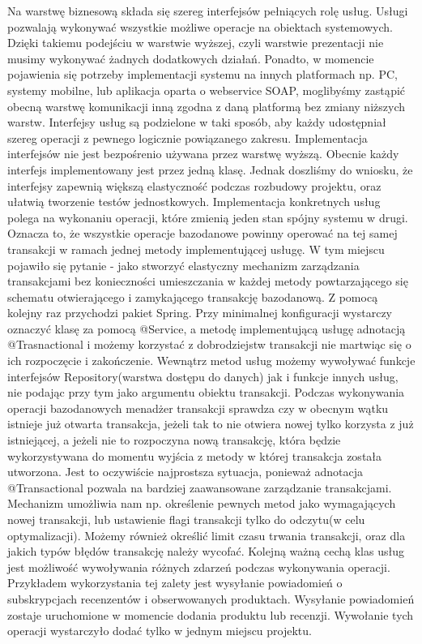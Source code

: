 Na warstwę biznesową składa się szereg interfejsów pełniących rolę usług. Usługi pozwalają wykonywać wszystkie możliwe operacje na obiektach systemowych. Dzięki takiemu podejściu w warstwie wyższej, czyli warstwie prezentacji nie musimy wykonywać żadnych dodatkowych działań. Ponadto, w momencie pojawienia się potrzeby implementacji systemu na innych platformach np. PC, systemy mobilne, lub aplikacja oparta o webservice SOAP, moglibyśmy zastąpić obecną warstwę komunikacji inną zgodna z daną platformą bez zmiany niższych warstw.
Interfejsy usług są podzielone w taki sposób, aby każdy udostępniał szereg operacji z pewnego logicznie powiązanego zakresu. Implementacja interfejsów nie jest bezpośrenio używana przez warstwę wyższą. Obecnie każdy interfejs implementowany jest przez jedną klasę. Jednak doszliśmy do wniosku, że interfejsy zapewnią większą elastyczność podczas rozbudowy projektu, oraz ułatwią tworzenie testów jednostkowych.
Implementacja konkretnych usług polega na wykonaniu operacji, które zmienią jeden stan spójny systemu w drugi. Oznacza to, że wszystkie operacje bazodanowe powinny operować na tej samej transakcji w ramach jednej metody implementującej usługę. W tym miejscu pojawiło się pytanie - jako stworzyć elastyczny mechanizm zarządzania transakcjami bez konieczności umieszczania w każdej metody powtarzającego się schematu otwierającego i zamykającego transakcję bazodanową. Z pomocą kolejny raz przychodzi pakiet Spring. Przy minimalnej konfiguracji wystarczy oznaczyć klasę za pomocą @Service, a metodę implementującą usługę adnotacją @Trasnactional i możemy korzystać z dobrodziejstw transakcji nie martwiąc się o ich rozpoczęcie i zakończenie. Wewnątrz metod usług możemy wywoływać funkcje interfejsów Repository(warstwa dostępu do danych) jak i funkcje innych usług, nie podając przy tym jako argumentu obiektu transakcji. Podczas wykonywania operacji bazodanowych menadżer transakcji sprawdza czy w obecnym wątku istnieje już otwarta transakcja, jeżeli tak to nie otwiera nowej tylko korzysta z już istniejącej, a jeżeli nie to rozpoczyna nową transakcję, która będzie wykorzystywana do momentu wyjścia z metody w której transakcja została utworzona. Jest to oczywiście najprostsza sytuacja, ponieważ adnotacja @Transactional pozwala na bardziej zaawansowane zarządzanie transakcjami. Mechanizm umożliwia nam np. określenie pewnych metod jako wymagających nowej transakcji, lub ustawienie flagi transakcji tylko do odczytu(w celu optymalizacji). Możemy również określić limit czasu trwania transakcji, oraz dla jakich typów błędów transakcję należy wycofać. 
Kolejną ważną cechą klas usług jest możliwość wywoływania różnych zdarzeń podczas wykonywania operacji. Przykładem wykorzystania tej zalety jest wysyłanie powiadomień o subskrypcjach recenzentów i obserwowanych produktach. Wysyłanie powiadomień zostaje uruchomione w momencie dodania produktu lub recenzji. Wywołanie tych operacji wystarczyło dodać tylko w jednym miejscu projektu.

